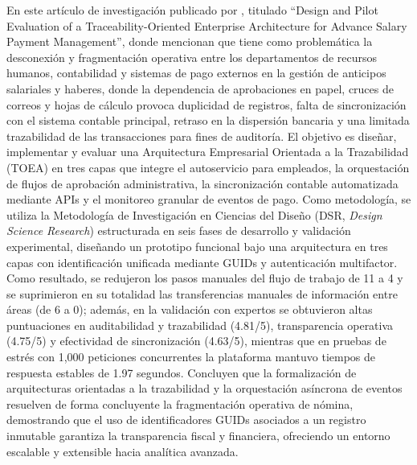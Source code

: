 En este artículo de investigación publicado por \textcite{aliya2026design}, titulado ``Design and Pilot Evaluation of a Traceability-Oriented Enterprise Architecture for Advance Salary Payment Management'', 
donde mencionan que tiene como problemática la desconexión y fragmentación operativa entre los departamentos de recursos humanos, contabilidad y sistemas de pago externos en la gestión de anticipos salariales y haberes, 
donde la dependencia de aprobaciones en papel, cruces de correos y hojas de cálculo provoca duplicidad de registros, falta de sincronización con el sistema contable principal, 
retraso en la dispersión bancaria y una limitada trazabilidad de las transacciones para fines de auditoría. 
El objetivo es diseñar, implementar y evaluar una Arquitectura Empresarial Orientada a la Trazabilidad (TOEA) en tres capas que integre el autoservicio para empleados, la orquestación de flujos de aprobación administrativa, 
la sincronización contable automatizada mediante APIs y el monitoreo granular de eventos de pago. Como metodología, 
se utiliza la Metodología de Investigación en Ciencias del Diseño (DSR, \textit{Design Science Research}) 
estructurada en seis fases de desarrollo y validación experimental, 
diseñando un prototipo funcional bajo una arquitectura en tres capas con identificación unificada mediante GUIDs y autenticación multifactor. 
Como resultado, se redujeron los pasos manuales del flujo de trabajo de 11 a 4 y se suprimieron en su totalidad las transferencias
manuales de información entre áreas (de 6 a 0); además, en la validación con expertos se obtuvieron altas puntuaciones en auditabilidad y trazabilidad (4.81/5), 
transparencia operativa (4.75/5) y efectividad de sincronización (4.63/5), mientras que en pruebas de estrés con 1,000 peticiones concurrentes la plataforma mantuvo tiempos de respuesta estables de 1.97 segundos. 
Concluyen que la formalización de arquitecturas orientadas a la trazabilidad y la orquestación asíncrona de eventos resuelven de forma concluyente 
la fragmentación operativa de nómina, demostrando que el uso de identificadores GUIDs asociados a un registro inmutable garantiza la transparencia fiscal 
y financiera, ofreciendo un entorno escalable y extensible hacia analítica avanzada.


